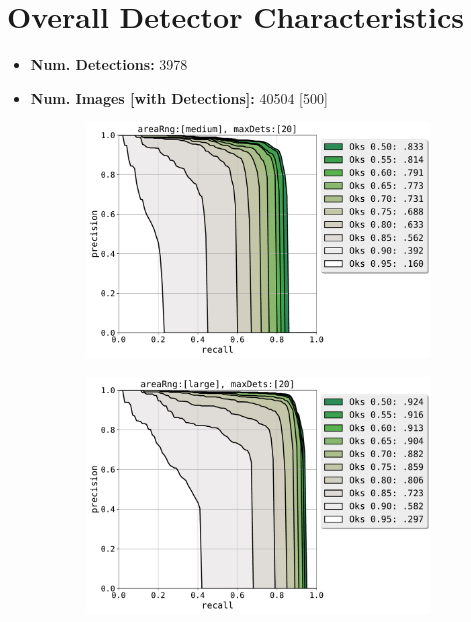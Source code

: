 \documentclass[10pt,onecolumn,letterpaper]{article}
\begin{document}
\section{Overall Detector Characteristics}
\begin{itemize}
    \item \textbf{Num. Detections:} 3978
    \item \textbf{Num. Images [with Detections]:} 40504 [500]
\end{itemize}
\vspace{-5mm}
\begin{figure}[h!]
\centering
\begin{subfigure}{.4\linewidth}
\centering
\includegraphics[width=\linewidth]{./result/rmpe/prc_[rmpe][medium][20].pdf}
\label{fig:sub1}
\end{subfigure}%
\begin{subfigure}{.4\linewidth}
\centering
\includegraphics[width=\linewidth]{./result/rmpe/prc_[rmpe][large][20].pdf}

\end{subfigure}
\end{figure}
\end{document}
